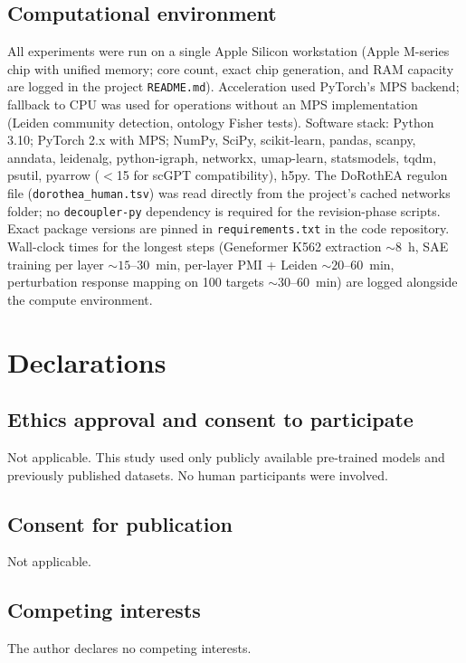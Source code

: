 \documentclass[onecolumn]{article}
\begin{document}
\subsection{Computational environment}
All experiments were run on a single Apple Silicon workstation (Apple M-series chip with unified memory; core count, exact chip generation, and RAM capacity are logged in the project \texttt{README.md}). Acceleration used PyTorch's MPS backend; fallback to CPU was used for operations without an MPS implementation (Leiden community detection, ontology Fisher tests). Software stack: Python 3.10; PyTorch 2.x with MPS; NumPy, SciPy, scikit-learn, pandas, scanpy, anndata, leidenalg, python-igraph, networkx, umap-learn, statsmodels, tqdm, psutil, pyarrow ($<$15 for scGPT compatibility), h5py. The DoRothEA regulon file (\texttt{dorothea\_human.tsv}) was read directly from the project's cached networks folder; no \texttt{decoupler-py} dependency is required for the revision-phase scripts. Exact package versions are pinned in \texttt{requirements.txt} in the code repository. Wall-clock times for the longest steps (Geneformer K562 extraction $\sim 8$~h, SAE training per layer $\sim 15$--30~min, per-layer PMI + Leiden $\sim 20$--60~min, perturbation response mapping on 100 targets $\sim 30$--60~min) are logged alongside the compute environment.


\section*{Declarations}

\subsection*{Ethics approval and consent to participate}
Not applicable. This study used only publicly available pre-trained models and previously published datasets. No human participants were involved.

\subsection*{Consent for publication}
Not applicable.

\subsection*{Competing interests}
The author declares no competing interests.
\end{document}
